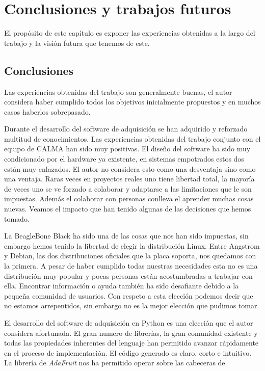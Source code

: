 \chapter{Conclusiones y trabajos futuros}
\label{cap_conclusiones}
El propósito de este capítulo es exponer las experiencias obtenidas a la largo del trabajo y la visión futura que tenemos de este.

\section{Conclusiones}
	Las experiencias obtenidas del trabajo son generalmente buenas, el autor considera haber cumplido todos los objetivos inicialmente propuestos
	y en muchos casos haberlos sobrepasado. 
	\par
	Durante el desarrollo del software de adquisición  se han adquirido y reforzado multitud de conocimientos. Las experiencias obtenidas del
	trabajo conjunto con el equipo de CALMA han sido muy positivas. El diseño del software ha sido muy condicionado por el hardware ya existente,
	en sistemas empotrados estos dos están muy enlazados. El autor no considera esto como una desventaja sino como una ventaja. Raras veces en
	proyectos reales uno tiene libertad total, la mayoría de veces uno se ve forzado  a colaborar y adaptarse a las limitaciones que le son
	impuestas. Además el colaborar con personas conlleva el aprender muchas cosas nuevas. Veamos el impacto que han tenido algunas de las
	decisiones que hemos tomado.
	\par
	La BeagleBone Black ha sido una de las cosas que nos han sido impuestas, sin embargo hemos tenido la libertad de elegir la distribución Linux.
	Entre Angstrom y Debian, las dos distribuciones oficiales que la placa soporta, nos quedamos con la primera. A pesar de haber cumplido todas
	nuestras necesidades esta no es una distribución muy popular y pocas personas están acostumbradas a trabajar con ella. Encontrar información o
	ayuda también ha sido desafiante debido a la pequeña comunidad de usuarios. Con respeto a esta elección podemos decir que no estamos
	arrepentidos, sin embargo no es la mejor elección que pudimos tomar. 
	\par
	El desarrollo del software de adquisición en Python es una elección que el autor considera afortunada. El gran numero de librerías, la gran
	comunidad existente y todas las propiedades inherentes del lenguaje han permitido avanzar rápidamente en el proceso de implementación. El
	código generado es claro, corto e intuitivo. La librería de \emph{AdaFruit}\cite{AdaFruitGit} nos ha permitido operar sobre las cabeceras de
